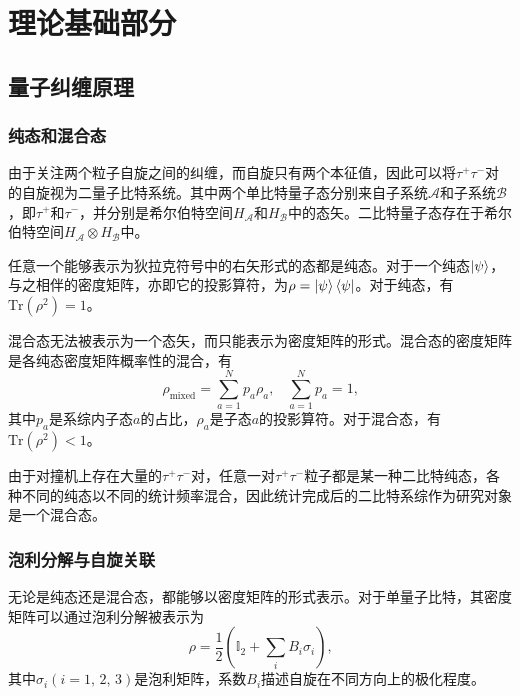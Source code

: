 \chapter{理论基础部分}
\label{chap:theory}

\section{量子纠缠原理}
\label{sec:twopone}

\subsection{纯态和混合态}
\label{sec:twoponepone}

由于关注两个粒子自旋之间的纠缠，而自旋只有两个本征值，因此可以将$ \tau^+ \tau^- $对的自旋视为二量子比特系统。其中两个单比特量子态分别来自子系统$ \mathcal{A} $和子系统$ \mathcal{B} $，即$ \tau^+ $和$ \tau^- $，并分别是希尔伯特空间$ H_{\mathcal{A}} $和$ H_{\mathcal{B}} $中的态矢。二比特量子态存在于希尔伯特空间$ H_{\mathcal{A}} \otimes H_{\mathcal{B}} $中。

任意一个能够表示为狄拉克符号中的右矢形式的态都是纯态。对于一个纯态$ \ket{\psi} $，与之相伴的密度矩阵，亦即它的投影算符，为$ \rho = \ket{\psi} \bra{\psi} $。对于纯态，有$ \mathrm{Tr}(\rho^2)=1 $。

混合态无法被表示为一个态矢，而只能表示为密度矩阵的形式。混合态的密度矩阵是各纯态密度矩阵概率性的混合，有
\begin{equation*}
\rho_{\text{mixed}}=\sum_{a=1}^N p_a\rho_a \text{,}\quad \sum_{a=1}^N p_a=1\text{,}
\tag{2.1}
\end{equation*}
\noindent 其中$ p_a $是系综内子态$ a $的占比，$ \rho_a $是子态$ a $的投影算符。对于混合态，有$ \mathrm{Tr}(\rho^2)<1 $。

由于对撞机上存在大量的$ \tau^+ \tau^- $对，任意一对$ \tau^+ \tau^- $粒子都是某一种二比特纯态，各种不同的纯态以不同的统计频率混合，因此统计完成后的二比特系综作为研究对象是一个混合态。

\subsection{泡利分解与自旋关联}
\label{sec:twoponeptwo}

无论是纯态还是混合态，都能够以密度矩阵的形式表示。对于单量子比特，其密度矩阵可以通过泡利分解被表示为
\begin{equation*}
\rho=\frac{1}{2} \left( \mathbb{I}_2+\sum_{i} B_i \sigma_i \right)\text{,}
\tag{2.2}
\end{equation*}
\noindent 其中$\sigma_i(i=1\text{, }2\text{, }3)$是泡利矩阵，系数$B_i$描述自旋在不同方向上的极化程度。

